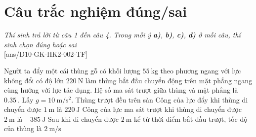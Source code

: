 \section{Câu trắc nghiệm đúng/sai} 
\textit{Thí sinh trả lời từ câu 1 đến câu 4. Trong mỗi ý \textbf{a)}, \textbf{b)}, \textbf{c)}, \textbf{d)} ở mỗi câu, thí sinh chọn đúng hoặc sai}
\setcounter{ex}{0}\\
[ans/D10-GK-HK2-002-TF]
\begin{ex}
	Người ta đẩy một cái thùng gỗ có khối lượng $\SI{55}{\kilogram}$ theo phương ngang với lực không đổi có độ lớn $\SI{220}{\newton}$ làm thùng bắt đầu chuyển động trên mặt phẳng ngang cùng hướng với lực tác dụng. Hệ số ma sát trượt giữa thùng và mặt phẳng là $\SI{0.35}{}$. Lấy $g =\SI{10}{\meter/\second^2}$.
	\choiceTF
	{Thùng trượt đều trên sàn}
	{\True Công của lực đẩy khi thùng di chuyển được $\SI{1}{\meter}$ là $\SI{220}{\joule}$}
	{\True Công của lực ma sát trượt khi thùng di chuyển được $\SI{2}{\meter}$ là $\SI{-385}{\joule}$
	}
	{Sau khi di chuyển được $\SI{2}{\meter}$ kể từ thời điểm bắt đầu trượt, tốc độ của thùng là $\SI{2}{\meter/\second}$}
\end{ex}
